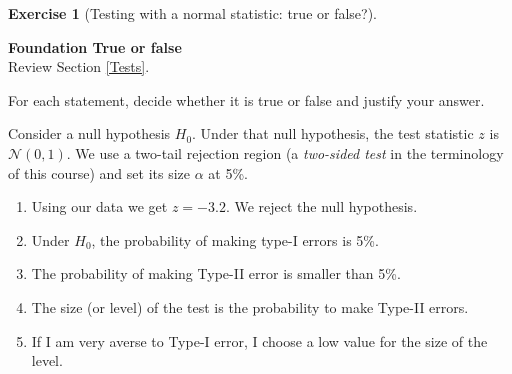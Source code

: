 \documentclass[
  11pt,
]{book}
\theoremstyle{definition}
\theoremstyle{definition}
\theoremstyle{definition}
\newtheorem{exercise}{Exercise}[chapter]
\theoremstyle{definition}
\theoremstyle{remark}
\begin{document}
\begin{exercisebox}

\begin{exercise}[Testing with a normal statistic: true or false?]
\protect\hypertarget{exr:tests-normal-test-true-false}{}\label{exr:tests-normal-test-true-false}

\textbf{Foundation \textbar{} True or false}\\
Review Section \ref{Tests}.

For each statement, decide whether it is true or false and justify your answer.

Consider a null hypothesis \(H_0\). Under that null hypothesis, the test statistic \(z\) is \(\mathcal{N}(0, 1)\). We use a two-tail rejection region (a \emph{two-sided test} in the terminology of this course) and set its size \(\alpha\) at 5\%.

\begin{enumerate}
\def\labelenumi{\arabic{enumi}.}
\item
  Using our data we get \(z = -3.2\). We reject the null hypothesis.
\item
  Under \(H_0\), the probability of making type-I errors is 5\%.
\item
  The probability of making Type-II error is smaller than 5\%.
\item
  The size (or level) of the test is the probability to make Type-II errors.
\item
  If I am very averse to Type-I error, I choose a low value for the size of the level.
\end{enumerate}

\end{exercise}

\end{exercisebox}

\end{document}

